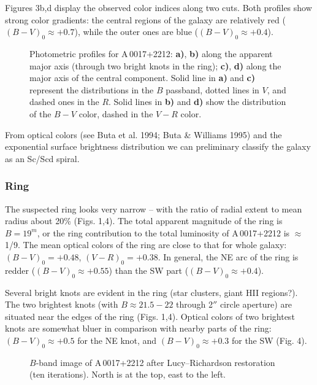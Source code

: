 \documentclass[]{aa}
\begin{document}
Figures 3b,d display the observed color indices along two cuts.
Both profiles show strong color gradients: the central regions
of the galaxy are relatively red ($(B-V)_0\approx+0.7$), while
the outer ones are blue ($(B-V)_0\approx+0.4$). 

\begin{figure}
\centerline{}
\caption{Photometric profiles for A\,0017+2212: {\bf a)}, {\bf b)}
along the apparent major axis (through two bright knots in the ring);
{\bf c)}, {\bf d)} along the major axis of the central component.
Solid line in {\bf a)} and {\bf c)} represent the distributions in
the $B$ passband, dotted lines in $V$, and dashed ones in the $R$.
Solid lines in {\bf b)} and {\bf d)} show the distribution of the
$B-V$ color, dashed in the $V-R$ color.}
\end{figure}

From optical colors (see Buta et al. 1994; Buta \& Williams 1995)
and the exponential surface brightness distribution we can preliminary 
classify the galaxy as an Sc/Scd spiral. 

\subsubsection{Ring}

The suspected ring looks very narrow -- with the ratio of
radial extent to mean radius about 20\% (Figs. 1,4). The total apparent
magnitude of the ring is $B = 19^m$, or the ring contribution to
the total luminosity of A\,0017+2212 is $\approx$1/9.
The mean optical colors of the ring are close to that for whole
galaxy: $(B-V)_0=+0.48$, $(V-R)_0=+0.38$. In general, the NE arc of
the ring is redder ($(B-V)_0\approx+0.55$) than the SW part
($(B-V)_0\approx+0.4$).

Several bright knots are evident in the ring (star clusters, giant
HII regions?). The two brightest knots (with $B\approx21.5-22$ through
2$''$ circle aperture) are 
situated near the edges of the ring (Figs. 1,4). Optical colors of
two brightest knots are somewhat bluer in comparison with
nearby parts of the ring: $(B-V)_0\approx+0.5$ for the NE knot,
and $(B-V)_0\approx+0.3$ for the SW (Fig. 4). 

\begin{figure}
\centerline{}
\caption{$B$-band image of A\,0017+2212 after Lucy--Richardson
restoration (ten iterations). North is at the top, east to the left.}
\end{figure}
\end{document}
